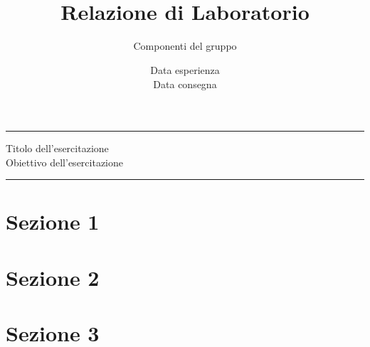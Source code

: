 \documentclass[11pt]{article}
\begin{document}
\setlength{\parindent}{0pt}
\title{\vspace{-4em}{\large Nome istituzione} \\
    Relazione di Laboratorio}
\author{Componenti del gruppo}
\date{Data esperienza \\
    Data consegna}
\maketitle

\vspace{-2em}\par\noindent\rule{\textwidth}{0.4pt}
\begin{center}
    {\Large\sc Titolo dell'esercitazione}  \\
    Obiettivo dell'esercitazione
\end{center}
\par\noindent\rule{\textwidth}{0.4pt}
\section{Sezione 1}
\section{Sezione 2}
\section{Sezione 3}
\end{document}

